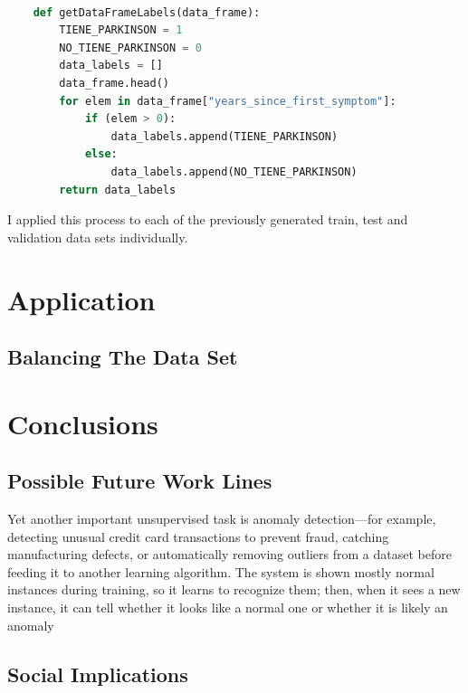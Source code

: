 \documentclass[12pt, a4paper]{article}
\begin{document}
	\vspace{5mm}
	
	\begin{lstlisting}[language=Python]
		
	def getDataFrameLabels(data_frame):
		TIENE_PARKINSON = 1
		NO_TIENE_PARKINSON = 0
		data_labels = []
		data_frame.head()
		for elem in data_frame["years_since_first_symptom"]:
			if (elem > 0):
				data_labels.append(TIENE_PARKINSON)
			else:
				data_labels.append(NO_TIENE_PARKINSON)
		return data_labels
	\end{lstlisting}
	
	I applied this process to each of the previously generated train, test and validation data sets individually. 
	
	\clearpage
	
	\section{Application}
	
	\clearpage
	
	\subsection{Balancing The Data Set}
	
	
	
	\clearpage
	
	\section{Conclusions}
	
	\clearpage
	
	\subsection{Possible Future Work Lines}
	
	Yet another important unsupervised task is anomaly detection—for example, detecting unusual credit card transactions to prevent fraud, catching manufacturing defects, or automatically removing outliers from a dataset before feeding it to another learning algorithm. The system is shown mostly normal instances during training, so it learns to recognize them; then, when it sees a new instance, it can tell whether it looks like a normal one or whether it is likely an anomaly
	
	\clearpage
	
	\subsection{Social Implications}
	
	
	\clearpage
	
	
	
	
	
	
	
\end{document}

